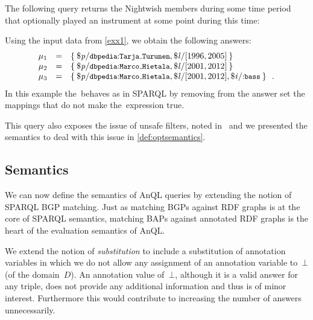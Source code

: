 \begin{example} 
  \label{exx2} 
  The following query returns the Nightwish members during some time period that optionally played an instrument at some
  point during this time:
  
  Using the input data from  \cref{exx1}, we obtain the following answers: 
  \[
  \begin{array}{lcl}
    \mu_{1} & = & \set{ \var{p}/\qname{dbpedia}{Tarja\mathunderscore{}Turunen}, \var{l}/[1996, 2005] } \\
    \mu_{2} & = & \set{ \var{p}/\qname{dbpedia}{Marco\mathunderscore{}Hietala}, \var{l}/[2001, 2012] } \\
    \mu_{3} & = & \set{ \var{p}/\qname{dbpedia}{Marco\mathunderscore{}Hietala}, \var{l}/[2001, 2012], \var{i}/\qname{}{bass} } \enspace .
  \end{array}
  \]
  In this example the~\FILTER behaves as in SPARQL by removing from the answer set the mappings that do not make
  the~\FILTER expression true.
\end{example}


\nd This query also exposes the issue of unsafe filters, noted in~\citet{AnglesGutierrez:2008aa} and we presented the
semantics to deal with this issue in \cref{def:optsemantics}.



\subsection{Semantics}
\label{sec:aSPARQL-semantics}

We can now define the semantics of AnQL queries by extending the notion of SPARQL BGP matching.  
%
Just as matching \acp{BGP} against \ac{RDF} graphs is at the core of SPARQL semantics, matching \acp{BAP} against
annotated \ac{RDF} graphs is the heart of the evaluation semantics of AnQL.

We extend the notion of \emph{substitution} to include a substitution of annotation variables in which we do not allow
any assignment of an annotation variable to~$\bot$ (of the domain~$D$).  
%
An annotation value of~$\bot$, although it is a valid answer for any triple, does not provide any additional information
and thus is of minor interest. Furthermore this would contribute to increasing the number of answers unnecessarily.

